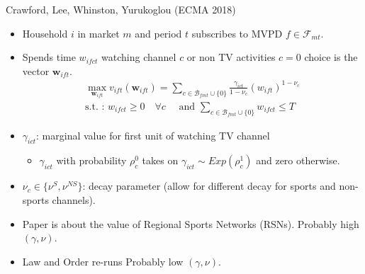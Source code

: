 \begin{frame}{Crawford, Lee, Whinston, Yurukoglou (ECMA 2018)}
\begin{itemize}
\item Household $i$ in market $m$ and period $t$ subscribes to MVPD $f \in \mathcal{F}_{mt}$.
\item Spends time $w_{ifct}$ watching channel $c$ or non TV activities $c=0$ choice is the vector $\mathbf{w}_{ift}$.
\begin{eqnarray*}
\max_{\mathbf{w}_{ift}} v_{ift}(\mathbf{w}_{ift}) =  \sum_{c \in \mathcal{B}_{fmt} \cup \{0\}}  \frac{\gamma_{ict}}{1-\nu_c}(w_{ift})^{1-\nu_c}\\
\mbox{s.t. : } w_{ifct} \geq 0\quad  \forall c \quad \mbox{ and } \sum_{c \in \mathcal{B}_{fmt} \cup \{0\}} w_{ifct} \leq T
\end{eqnarray*}
\item $\gamma_{ict}$: marginal value for first unit of watching TV channel
\begin{itemize}
\item $\gamma_{ict}$ with probability $\rho_c^0$ takes on $\gamma_{ict} \sim Exp(\rho_c^1)$ and zero otherwise.
\end{itemize}
\item $\nu_c \in \{\nu^{S},\nu^{NS}\}$: decay parameter (allow for different decay for sports and non-sports channels).
\item Paper is about the value of \alert{Regional Sports Networks} (RSNs). Probably high $(\gamma,\nu)$.
\item Law and Order re-runs Probably low $(\gamma,\nu)$.
\end{itemize}
\end{frame}



